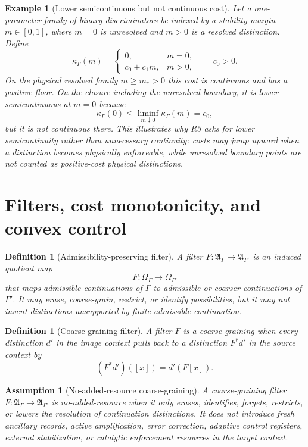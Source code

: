 \documentclass[11pt]{article}
\newtheorem{definition}[theorem]{Definition}
\newtheorem{assumption}[theorem]{Assumption}
\newtheorem{example}[theorem]{Example}
\newcommand{\A}{\mathfrak A}
\begin{document}
\begin{example}[Lower semicontinuous but not continuous cost]\label{ex:lsc-not-continuous-cost}
Let a one-parameter family of binary discriminators be indexed by a stability margin $m\in[0,1]$, where $m=0$ is unresolved and $m>0$ is a resolved distinction.  Define
\[
  \kappa_\Gamma(m)=
  \begin{cases}
  0, & m=0,\\
  c_0+c_1 m, & m>0,
  \end{cases}
  \qquad c_0>0.
\]
On the physical resolved family $m\ge m_*>0$ this cost is continuous and has a positive floor.  On the closure including the unresolved boundary, it is lower semicontinuous at $m=0$ because
\[
  \kappa_\Gamma(0)\le \liminf_{m\downarrow0}\kappa_\Gamma(m)=c_0,
\]
but it is not continuous there.  This illustrates why R3 asks for lower semicontinuity rather than unnecessary continuity: costs may jump upward when a distinction becomes physically enforceable, while unresolved boundary points are not counted as positive-cost physical distinctions.
\end{example}

\section{Filters, cost monotonicity, and convex control}\label{sec:filters-convexity}

\begin{definition}[Admissibility-preserving filter]
A filter $F:\A_\Gamma\to\A_{\Gamma'}$ is an induced quotient map
\[
 F:\Omega_\Gamma\to\Omega_{\Gamma'}
\]
that maps admissible continuations of $\Gamma$ to admissible or coarser continuations of $\Gamma'$.  It may erase, coarse-grain, restrict, or identify possibilities, but it may not invent distinctions unsupported by finite admissible continuation.
\end{definition}

\begin{definition}[Coarse-graining filter]
A filter $F$ is a coarse-graining when every distinction $d'$ in the image context pulls back to a distinction $F^*d'$ in the source context by
\[
 (F^*d')([x])=d'(F[x]).
\]
\end{definition}

\begin{assumption}[No-added-resource coarse-graining]\label{ass:no-added-resource}
A coarse-graining filter $F:\A_\Gamma\to\A_{\Gamma'}$ is \emph{no-added-resource} when it only erases, identifies, forgets, restricts, or lowers the resolution of continuation distinctions.  It does not introduce fresh ancillary records, active amplification, error correction, adaptive control registers, external stabilization, or catalytic enforcement resources in the target context.
\end{assumption}
\end{document}
